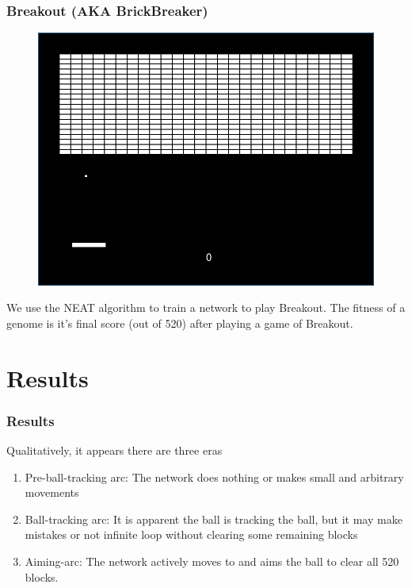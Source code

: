\documentclass[t,pdflatex]{beamer}
\begin{document}
        \begin{frame}

            \frametitle{Breakout (AKA BrickBreaker)}
        \begin{figure}
        \centering
        \includegraphics[width=.54 \textwidth]{breakout.png}
        \end{figure}

        We use the NEAT algorithm to train a network to play Breakout.
        The fitness of a genome is it's final score (out of 520) after playing a game of Breakout.

    \end{frame}

\section{Results}

    \begin{frame}

        \frametitle{Results}
        Qualitatively, it appears there are three eras
        \begin{enumerate}
            \item Pre-ball-tracking arc: The network does nothing or makes small and arbitrary movements
            \item Ball-tracking arc: It is apparent the ball is tracking the ball, but it may make mistakes or not infinite loop without clearing some remaining blocks
            \item Aiming-arc: The network actively moves to and aims the ball to clear all 520 blocks.
        \end{enumerate}

    \end{frame}
\end{document}
